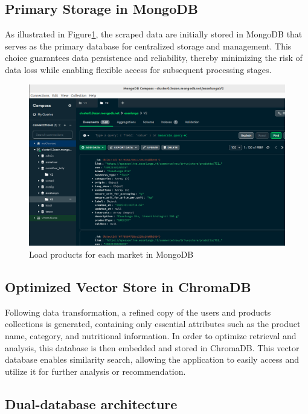 \subsection{Primary Storage in MongoDB}
As illustrated in Figure\ref{fig:load_data_mongo}, the scraped data are initially stored in MongoDB that serves as the primary database for centralized storage and management. 
This choice guarantees data persistence and reliability, thereby minimizing the risk of data loss while enabling flexible access for subsequent processing stages.


\begin{center}
\begin{figure}[H]
    \includegraphics[scale=0.35]{images/load_data.png}
    \caption{Load products for each market in MongoDB} 
    \label{fig:load_data_mongo}
\end{figure}
\end{center}

\subsection{Optimized Vector Store in ChromaDB}
Following data transformation, a refined copy of the users and products
collections is generated, containing only essential attributes such as
the product name, category, and nutritional information. In order to
optimize retrieval and analysis, this database is then embedded and
stored in ChromaDB. This vector database enables similarity search,
allowing the application to easily access and utilize it for further analysis
or recommendation.


\subsection{Dual-database architecture}
 
